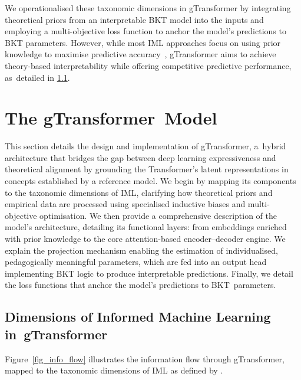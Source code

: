 \documentclass[applsci,article,accept,moreauthors,pdftex]{Definitions/mdpi}
\begin{document}
We {operationalised} these taxonomic dimensions in gTransformer by integrating theoretical priors from an interpretable BKT model into the inputs and employing a multi-objective loss function to anchor the model's predictions to BKT parameters. However, while most IML approaches focus on using prior knowledge to {maximise} predictive accuracy~\citep{vonrueden2021informed}, gTransformer aims to achieve theory-based interpretability while offering competitive predictive performance, as~detailed in \cref{sec_iml_gtransformer}. 


\section{The gTransformer~Model} \label{sec_arch}

This section details the design and implementation of gTransformer, a~hybrid architecture that bridges the gap between deep learning expressiveness and theoretical alignment by grounding the Transformer's latent representations in concepts established by a reference model. We begin by mapping its components to the taxonomic dimensions of IML, clarifying how theoretical priors and empirical data are processed using specialised inductive biases and multi-objective {optimisation}. We then provide a comprehensive description of the model's architecture, detailing its functional layers: from embeddings enriched with prior knowledge to the core attention-based encoder--decoder engine. We explain the projection mechanism enabling the estimation of {individualised}, pedagogically meaningful parameters, which are fed into an output head implementing BKT logic to produce interpretable predictions. Finally, we detail the loss functions that anchor the model's predictions to BKT~parameters.

\subsection{Dimensions of Informed Machine Learning in~gTransformer} \label{sec_iml_gtransformer}

Figure~\ref{fig_info_flow} illustrates the information flow through gTransformer, mapped to the taxonomic dimensions of IML as defined by \citet{vonrueden2021informed}.
\end{document}
